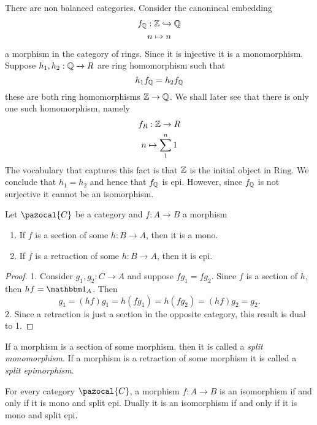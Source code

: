 \begin{example}
    There are non balanced categories. Consider the canonincal embedding 
    \begin{gather*}
        f_{\mathbb{Q}}: \mathbb{Z} \hookrightarrow \mathbb{Q}\\
        n \mapsto n
    \end{gather*}
    a morphism in the category of rings. Since it is injective it is a monomorphism. Suppose $h_1,h_2: \mathbb{Q} \rightarrow R$ are ring homomorphism such that 
    $$
        h_1 f_{\mathbb{Q}} = h_2 f_{\mathbb{Q}} 
    $$
    these are both ring homomorphisms $\mathbb{Z}\rightarrow \mathbb{Q}$. We shall later see that there is only one such homomorphism, namely
    \begin{gather*}
        f_R : \mathbb{Z} \rightarrow R\\
        n\mapsto \sum_1^n 1
    \end{gather*}
    The vocabulary that captures this fact is that $\mathbb{Z}$ is the initial object in $\mathrm{Ring}$. We conclude that $h_1 =h_2$ and hence that $f_{\mathbb{Q}}$ is epi. However, since $f_{\mathbb{Q}}$ is not surjective it cannot be an isomorphism.  
\end{example}
\begin{lemma}
    Let $\pazocal{C}$ be a category and $f : A\rightarrow B$ a morphism
    \begin{enumerate}
        \item If $f$ is a section of some $h: B\rightarrow A$, then it is a mono.
        \item If $f$ is a retraction of some $h: B\rightarrow A$, then it is epi.
    \end{enumerate} 
\end{lemma}
\begin{proof}
    1. Consider $g_1,g_2: C\rightarrow A$ and suppose $fg_1 = f g_2$. Since $f$ is a section of $h$, then $hf = \fone_A$. Then 
    $$
        g_1 = (hf)g_1 = h(fg_1) = h (fg_2)= (hf)g_2 = g_2.
    $$
    2. Since a retraction is just a section in the opposite category, this result is dual to 1.
\end{proof}
\begin{remark}
    If a morphism is a section of some morphism, then it is called a \emph{split monomorphism}. If a morphism is a retraction of some morphism it is called a \emph{split epimorphism}.
\end{remark}
\begin{lemma}
    For every category $\pazocal{C}$, a morphism $f : A\rightarrow B$ is an isomorphism if and only if it is mono and split epi. Dually it is an isomorphism if and only if it is mono and split epi.
\end{lemma}
